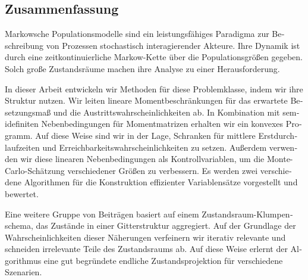 \begin{otherlanguage}{ngerman}
\chapter*{Zusammenfassung}
Markowsche Populationsmodelle sind ein leistungsfähiges Paradigma zur Beschreibung von Prozessen stochastisch interagierender Akteure. Ihre Dynamik ist durch eine zeitkontinuierliche Markow-Kette über die Populationsgrößen gegeben. Solch große Zustandsräume machen ihre Analyse zu einer Herausforderung.

In dieser Arbeit entwickeln wir Methoden für diese Problemklasse, indem wir ihre Struktur nutzen. Wir leiten lineare Momentbeschränkungen für das erwartete Besetzungsmaß und die Austrittswahrscheinlichkeiten ab. In Kombination mit semidefiniten Nebenbedingungen für Momentmatrizen erhalten wir ein konvexes Programm. Auf diese Weise sind wir in der Lage, Schranken für mittlere Erstdurchlaufzeiten und Erreichbarkeitswahrscheinlichkeiten zu setzen. Außerdem verwenden wir diese linearen Nebenbedingungen als Kontrollvariablen, um die Monte-Carlo-Schätzung verschiedener Größen zu verbessern. Es werden zwei verschiedene Algorithmen für die Konstruktion effizienter Variablensätze vorgestellt und bewertet.

Eine weitere Gruppe von Beiträgen basiert auf einem Zustandsraum-Klumpenschema, das Zustände in einer Gitterstruktur aggregiert. Auf der Grundlage der Wahrscheinlichkeiten dieser Näherungen verfeinern wir iterativ relevante und schneiden irrelevante Teile des Zustandsraums ab. Auf diese Weise erlernt der Algorithmus eine gut begründete endliche Zustandsprojektion für verschiedene Szenarien.
\end{otherlanguage}


\vfill
